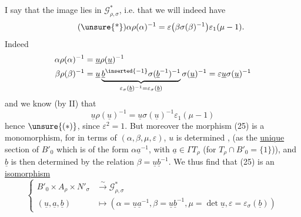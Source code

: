 I say that the image lies in $\mathcal G^*_{\rho,\sigma}$, i.e.
that we will indeed have
\[
\tag{\unsure{*}}
\alpha\rho(\alpha)^{-1}
=\varepsilon\bigl(\beta\sigma(\beta)^{-1}\bigr)\varepsilon_1(\mu-1).
\]
Indeed
\[
\begin{aligned}
\alpha\rho(\alpha)^{-1}&=\underline u\rho(\underline u)^{-1}\\
\beta\rho(\beta)^{-1}
&=\underline u\underbrace{
\underline b^{\inserted{-1}}\sigma(\underline b^{-1})^{-1}
}_{\varepsilon_\sigma(\underline b)^{-1}=\varepsilon_\sigma(\underline b)}
\sigma(\underline u)^{-1}
=\varepsilon\underline u\sigma(\underline u)^{-1}
\end{aligned}
\]
and we know (by II) that
\[
\underline u\rho(\underline u)^{-1}
=\underline u\sigma(\underline u)^{-1}\varepsilon_1(\mu-1)
\]
hence $\unsure{(*)}$, since $\varepsilon^2=1$. But
moreover the morphism (25) is a monomorphism, 
for in terms of $(\alpha,\beta,\mu,\varepsilon)$, $u$ is determined
,
(as the \uline{unique} section of $B'_0$ which
is of the form $\alpha\underline a^{-1}$, with $\underline a\in\Gamma T_\rho$
(for $T_\rho\cap B'_0=\{1\}$)), and $\underline b$ is then determined
by the relation $\beta=\underline u\underline b^{-1}$. We thus find
that (25) is an \uline{isomorphism}
\[
\tag{26}
\left\{\begin{aligned}
B'_0\times A_\rho\times N'_\sigma
&\overset{\sim}{\longrightarrow}\mathcal G^*_{\rho,\sigma}\\
(\underline u,\underline a,\underline b)
&\longmapsto
(\alpha=\underline u\underline a^{-1},\beta=\underline u\underline b^{-1},
\mu=\det\underline u,\varepsilon=\varepsilon_\sigma(\underline b))
\end{aligned}\right.
\]


